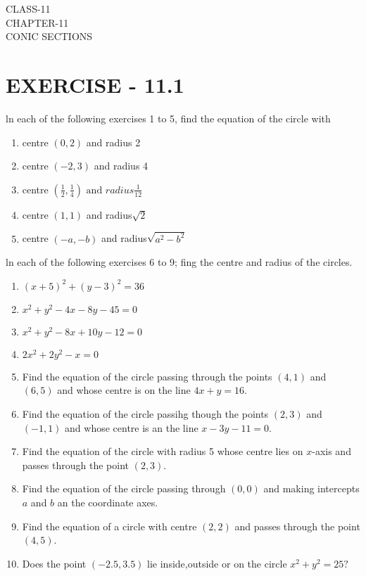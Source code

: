 \documentclass[12pt]{article}
\providecommand{\brak}[1]{\ensuremath{\left(#1\right)}}
\begin{document}
\begin{center}
\textbf\large{CLASS-11\\CHAPTER-11 \\ CONIC SECTIONS}
\end{center}

\section*{EXERCISE - 11.1}
ln each of the following exercises  1 to 5, find the equation of the circle with
\begin{enumerate}
\item centre $(0,2)$ and radius 2
\item centre $(-2,3)$ and radius 4
\item centre $ \brak{\frac{1}{2},\frac{1}{4}} \text{ and } radius \frac{1}{12}$
\item centre $(1,1)$ and radius$\sqrt{2}$
\item centre $(-a,-b)$ and radius$\sqrt{a^2-b^2}$
\end{enumerate}
ln each of the following exercises 6 to 9; fing the centre and radius of the circles.
\begin{enumerate}[resume]
\item $(x+5)^2+(y-3)^2=36$
\item $x^2+y^2-4x-8y-45=0$
\item $x^2+y^2-8x+10y-12=0$
\item $2x^2+2y^2-x=0$
\item Find the equation of the circle passing through the points $(4,1)$  and  $(6,5)$ and whose centre is on the line $4x+y=16$.
\item Find the equation of the circle passihg though the points $(2,3)$  and  $(-1,1)$  and  whose centre is an the line $x-3y-11=0$.
\item Find the equation of the circle with radius 5 whose centre lies on $x$-axis and passes through the point $(2,3)$.
\item Find the equation of the circle passing through $(0,0)$ and making intercepts $a$ and $b$ an the coordinate axes.
\item Find the equation of a circle  with centre $(2,2)$ and passes through the point $(4,5)$.
\item Does the point $(-2.5,3.5)$ lie inside,outside or on the circle $x^2+y^2=25?$
\end{enumerate}
\end{document}
